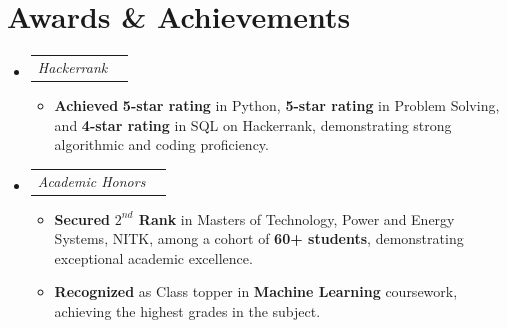 \documentclass[letterpaper,11pt]{article}
\makeatletter
\newcommand{\resumeItem}[1]{
  \item\small{
    {#1 \vspace{-2pt}}
  }
}
\newcommand{\resumeSubSubheading}[2]{
    \item
    \begin{tabular*}{0.97\textwidth}{l@{\extracolsep{\fill}}r}
      \textit{\small#1} & \textit{\small #2} \\
    \end{tabular*}\vspace{-7pt}
}
\newcommand{\resumeSubHeadingListStart}{\begin{itemize}[leftmargin=0.0in, label={}]}
\newcommand{\resumeSubHeadingListEnd}{\end{itemize}}
\newcommand{\resumeItemListStart}{\begin{itemize}}
\newcommand{\resumeItemListEnd}{\end{itemize}\vspace{-5pt}}
\makeatother
\begin{document}
\section{Awards \& Achievements}
  \resumeSubHeadingListStart
    \resumeSubSubheading{Hackerrank}{}
      \resumeItemListStart
        \resumeItem{\textbf{Achieved} \textbf{5-star rating} in Python, \textbf{5-star rating} in Problem Solving, and \textbf{4-star rating} in SQL on Hackerrank, demonstrating strong algorithmic and coding proficiency.}
      \resumeItemListEnd
    \resumeSubSubheading{Academic Honors}{}
      \resumeItemListStart
        \resumeItem{\textbf{Secured} \textbf{$2^{nd}$ Rank} in Masters of Technology, Power and Energy Systems, NITK, among a cohort of \textbf{60+ students}, demonstrating exceptional academic excellence.}
        \resumeItem{\textbf{Recognized} as Class topper in \textbf{Machine Learning} coursework, achieving the highest grades in the subject.}
      \resumeItemListEnd
  \resumeSubHeadingListEnd
\end{document}
